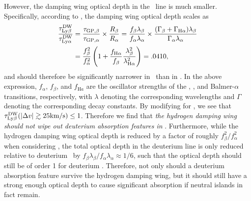 However, the damping wing optical depth in the \lyb\ line is much smaller. Specifically, according to , the damping wing optical depth scales as 
\begin{align}
\frac{\tau_{\text{Ly}\beta}^{\text{DW}}}{\tau_{\text{Ly}\alpha}^{\text{DW}}} &= \frac{\tau_{\text{GP},\beta}}{\tau_{\text{GP},\alpha}} \times \frac{R_{\beta}}{R_{\alpha}} = \frac{f_{\beta}\lambda_{\beta}}{f_{\alpha}\lambda_{\alpha}} \times \frac{(\Gamma_{\beta}+\Gamma_{\text{H}\alpha})\lambda_{\beta}}{\Gamma_{\alpha}\lambda_{\alpha}} \nonumber \\
&= \dfrac{f_{\beta}^{2}}{f_{\alpha}^{2}} \left( 1 + \dfrac{f_{\text{H}\alpha}}{f_{\beta}} \dfrac{\lambda_{\beta}^2}{\lambda_{\text{H}\alpha}^2} \right) = .0410,
\end{align}
and should therefore be significantly narrower in \lyb\ than in \lya. In the above expression, $f_{\alpha}$, $f_{\beta}$, and $f_{\text{H}a}$ are the oscillator strengths of the \lya, \lyb, and Balmer-$\alpha$ transitions, respectively, with $\lambda$ denoting the corresponding wavelengths and $\Gamma$ denoting the corresponding decay constants. By modifying  for \lyb, we see that $\tau_{\text{Ly}\beta}^{\text{DW}}(|\Delta v| \gtrsim 25\text{km}/\text{s}) \leq 1$. Therefore we find that \textit{the hydrogen damping wing should not wipe out deuterium absorption features in } \lyb. Furthermore, while the hydrogen damping wing optical depth is reduced by a factor of roughly $f_{\beta}^{2}/f_{\alpha}^{2}$ when considering \lyb, the total optical depth in the deuterium line is only reduced relative to deuterium \lya\ by $f_{\beta}\lambda_{\beta}/f_{\alpha}\lambda_{\alpha} \approx 1/6$, such that the optical depth should still be of order 1 for deuterium \lyb. Therefore, not only should a deuterium absorption feature survive the hydrogen damping wing, but it should still have a strong enough optical depth to cause significant absorption if neutral islands in fact remain.


